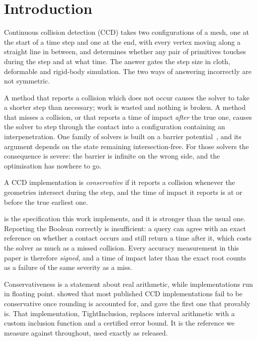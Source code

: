 \section{Introduction}
\label{sec:intro}

Continuous collision detection (CCD) takes two configurations of a mesh, one at
the start of a time step and one at the end, with every vertex moving along a
straight line in between, and determines whether any pair of primitives touches
during the step and at what time. The answer gates the step size in cloth,
deformable and rigid-body simulation. The two ways of answering incorrectly are
not symmetric.

A method that reports a collision which does not occur causes the solver to take
a shorter step than necessary; work is wasted and nothing is broken. A method
that misses a collision, or that reports a time of impact \emph{after} the true
one, causes the solver to step through the contact into a configuration
containing an interpenetration. One family of solvers is built on a barrier
potential~\citep{li2020ipc,li2021codim,ferguson2021rigid}, and its argument
depends on the state remaining intersection-free. For those solvers the
consequence is severe: the barrier is infinite on the wrong side, and the
optimisation has nowhere to go.

\begin{definition}[Conservative]
\label{def:conservative}
A CCD implementation is \emph{conservative} if it reports a collision whenever
the geometries intersect during the step, and the time of impact it reports is
at or before the true earliest one.
\end{definition}

 is the specification this work implements, and it is
stronger than the usual one. Reporting the Boolean correctly is insufficient: a
query can agree with an exact reference on whether a contact occurs and still
return a time after it, which costs the solver as much as a missed collision.
Every accuracy measurement in this paper is therefore \emph{signed}, and a time
of impact later than the exact root counts as a failure of the same severity as
a miss.

Conservativeness is a statement about real arithmetic, while implementations run
in floating point. \citet{wang2021tight} showed that most published CCD
implementations fail to be conservative once rounding is accounted for, and gave
the first one that provably is. That implementation, TightInclusion, replaces
interval arithmetic with a custom inclusion function and a certified error
bound. It is the reference we measure against throughout, used exactly as
released.
